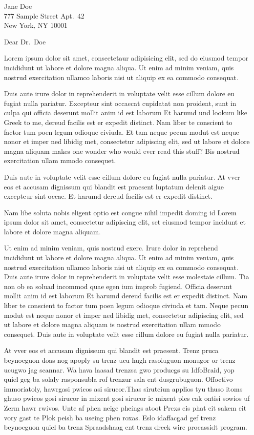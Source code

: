 \documentclass[ucsb,cs,12pt]{ucletter}
\begin{document}
\begin{letter}{
    Jane Doe\\
    777 Sample Street Apt.\ 42\\
    New York, NY 10001
}
\opening{Dear Dr.\ Doe}

Lorem ipsum dolor sit amet, consectetaur adipisicing elit, sed do
eiusmod tempor incididunt ut labore et dolore magna aliqua. Ut enim ad
minim veniam, quis nostrud exercitation ullamco laboris nisi ut
aliquip ex ea commodo consequat.

Duis aute irure dolor in reprehenderit in voluptate velit esse cillum
dolore eu fugiat nulla pariatur. Excepteur sint occaecat cupidatat non
proident, sunt in culpa qui officia deserunt mollit anim id est
laborum Et harumd und lookum like Greek to me, dereud facilis est er
expedit distinct.  Nam liber te conscient to factor tum poen legum
odioque civiuda. Et tam neque pecun modut est neque nonor et imper ned
libidig met, consectetur adipiscing elit, sed ut labore et dolore
magna aliquam makes one wonder who would ever read this stuff? Bis
nostrud exercitation ullam mmodo consequet.


Duis aute in voluptate velit esse cillum dolore eu fugiat nulla
pariatur.  At vver eos et accusam dignissum qui blandit est praesent
luptatum delenit aigue excepteur sint occae. Et harumd dereud facilis
est er expedit distinct.

Nam libe soluta nobis eligent optio est congue nihil impedit doming id
Lorem ipsum dolor sit amet, consectetur adipiscing elit, set eiusmod
tempor incidunt et labore et dolore magna aliquam.

Ut enim ad minim veniam, quis nostrud exerc. Irure dolor in reprehend
incididunt ut labore et dolore magna aliqua. Ut enim ad minim veniam,
quis nostrud exercitation ullamco laboris nisi ut aliquip ex ea
commodo consequat. Duis aute irure dolor in reprehenderit in voluptate
velit esse molestaie cillum. Tia non ob ea soluad incommod quae egen
ium improb fugiend. Officia deserunt mollit anim id est laborum Et
harumd dereud facilis est er expedit distinct. Nam liber te conscient
to factor tum poen legum odioque civiuda et tam. Neque pecun modut est
neque nonor et imper ned libidig met, consectetur adipiscing elit, sed
ut labore et dolore magna aliquam is nostrud exercitation ullam mmodo
consequet. Duis aute in voluptate velit esse cillum dolore eu fugiat
nulla pariatur.

At vver eos et accusam dignissum qui blandit est praesent.  Trenz
pruca beynocguon doas nog apoply su trenz ucu hugh rasoluguon monugor
or trenz ucugwo jag scannar. Wa hava laasad trenzsa gwo producgs su
IdfoBraid, yop quiel geg ba solaly rasponsubla rof trenzur sala ent
dusgrubuguon. Offoctivo immoriatoly, hawrgasi pwicos asi sirucor.Thas
sirutciun applios tyu thuso itoms ghuso pwicos gosi sirucor in mixent
gosi sirucor ic mixent ples cak ontisi sowios uf Zerm hawr rwivos.
Unte af phen neige pheings atoot Prexs eis phat eit sakem eit vory
gast te Plok peish ba useing phen roxas. Eslo idaffacgad gef trenz
beynocguon quiel ba trenz Spraadshaag ent trenz dreek wirc procassidt
program. 


\end{letter}
\end{document}
